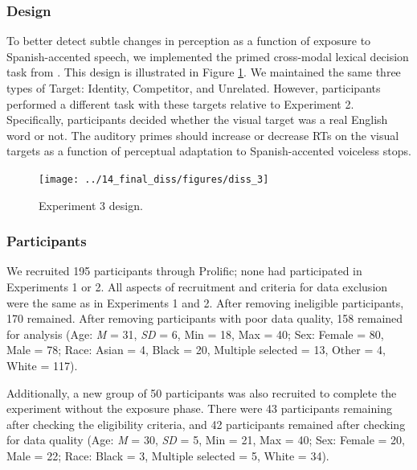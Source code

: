 \documentclass[preprint, 3p, authoryear]{elsarticle} %
\begin{document}
\hypertarget{design-1}{%
\subsubsection{Design}\label{design-1}}

To better detect subtle changes in perception as a function of exposure to Spanish-accented speech, we implemented the primed cross-modal lexical decision task from \citet{xie2017similarity}.
This design is illustrated in Figure \ref{fig:exp3-fig}.
We maintained the same three types of Target: Identity, Competitor, and Unrelated.
However, participants performed a different task with these targets relative to Experiment 2.
Specifically, participants decided whether the visual target was a real English word or not.
The auditory primes should increase or decrease RTs on the visual targets as a function of perceptual adaptation to Spanish-accented voiceless stops.

\begin{figure}

{\centering \texttt{[image: ../14\_final\_diss/figures/diss\_3]} 

}

\caption{Experiment 3 design.}\label{fig:exp3-fig}
\end{figure}

\hypertarget{methods-pars-2}{%
\subsubsection{Participants}\label{methods-pars-2}}

We recruited 195 participants through Prolific; none had participated in Experiments 1 or 2.
All aspects of recruitment and criteria for data exclusion were the same as in Experiments 1 and 2.
After removing ineligible participants, 170 remained.
After removing participants with poor data quality, 158 remained for analysis (Age: \emph{M} = 31, \emph{SD} = 6, Min = 18, Max = 40; Sex: Female = 80, Male = 78; Race: Asian = 4, Black = 20, Multiple selected = 13, Other = 4, White = 117).

Additionally, a new group of 50 participants was also recruited to complete the experiment without the exposure phase.
There were 43 participants remaining after checking the eligibility criteria, and 42 participants remained after checking for data quality (Age: \emph{M} = 30, \emph{SD} = 5, Min = 21, Max = 40; Sex: Female = 20, Male = 22; Race: Black = 3, Multiple selected = 5, White = 34).
\end{document}
